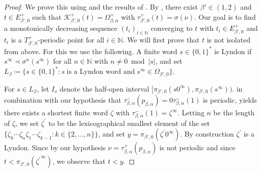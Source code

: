 \documentclass[a4paper,reqno,10pt]{amsart}
\begin{document}
\begin{proof}
We prove this using  and the results of \cite{KKLL}. By , there exist $\beta' \in (1, 2)$ and $t \in E_{\beta',0}^+$ such that $\mathcal{K}_{\beta',0}^+(t)=\Omega^+_{\beta,\alpha}$ with $\tau_{\beta',0}^{+}(t) = \sigma(\nu)$. Our goal is to find a monotonically decreasing sequence $(t_i)_{i \in \mathbb{N}}$ converging to $t$ with $t_i\in E_{\beta',0}^+$ and $t_i$ is a $T_{\beta', 0}^+$-periodic point for all $i \in \mathbb{N}$. We will first prove that $t$ is not isolated from above. For this we use the following. A finite word $s \in \{0, 1\}^{*}$ is Lyndon if $s^\infty \prec \sigma^n(s^\infty)$ for all $n \in \mathbb{N}$ with $n \neq 0 \bmod \lvert s \rvert$, and set $L_{\beta} \coloneqq \{ s\in \{0, 1\}^* \colon s \; \text{is a Lyndon word and} \; s^\infty \in \Omega_{\beta', 0} \}$.

For $s \in L_{\beta}$, let $I_{s}$ denote the half-open interval $[\pi_{\beta',0}(s0^\infty), \pi_{\beta',0}(s^\infty))$.  in combination with our hypothesis that $\tau_{\beta,\alpha}^{-}(p_{\beta,\alpha}) = 0\tau_{\beta,\alpha}^{-}(1)$ is periodic, yields there exists a shortest finite word $\zeta$ with $\tau_{\beta,\alpha}^{-}(1) = \zeta^\infty$.  Letting $n$ be the length of $\zeta$, we set $\zeta^\prime$ to be the lexicographical smallest element of the set $\{ \zeta_{k} \cdots \zeta_{n} \zeta_{1} \cdots \zeta_{k-1} \colon k \in \{2, \ldots, n \}\}$, and set $y = \pi_{\beta',0}(\zeta^\prime 0^\infty)$.  By construction $\zeta^{\prime}$ is a Lyndon. Since by our hypothesis $\nu = \tau^{+}_{\beta, \alpha}(p_{\beta,\alpha})$ is not periodic and since $t < \pi_{\beta',0}({\zeta^{\prime}}^{\infty})$, we observe that $t < y$.


\end{proof}
\end{document}
